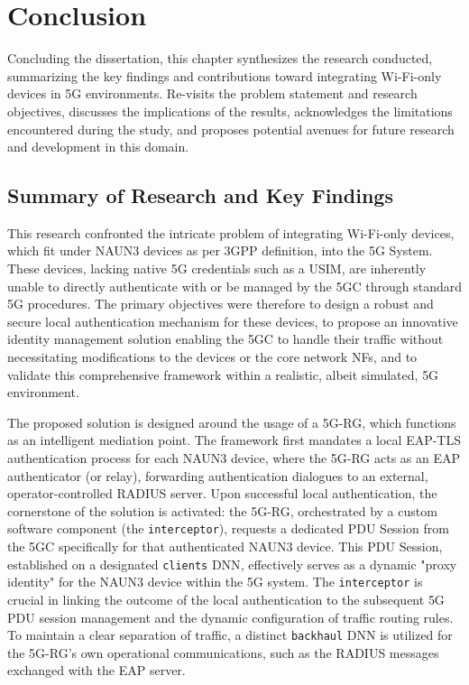 \chapter{Conclusion}%
\label{chapter:conclusion}

\begin{introduction}
Concluding the dissertation, this chapter synthesizes the research conducted, summarizing the key findings and contributions toward integrating Wi-Fi-only devices in \ac{5G} environments. Re-visits the problem statement and research objectives, discusses the implications of the results, acknowledges the limitations encountered during the study, and proposes potential avenues for future research and development in this domain.
\end{introduction}

\section{Summary of Research and Key Findings}

This research confronted the intricate problem of integrating Wi-Fi-only devices, which fit under \ac{NAUN3} devices as per \ac{3GPP} definition, into the \ac{5G} System. These devices, lacking native \ac{5G} credentials such as a \ac{USIM}, are inherently unable to directly authenticate with or be managed by the \ac{5GC} through standard \ac{5G} procedures. The primary objectives were therefore to design a robust and secure local authentication mechanism for these devices, to propose an innovative identity management solution enabling the \ac{5GC} to handle their traffic without necessitating modifications to the devices or the core network \acp{NF}, and to validate this comprehensive framework within a realistic, albeit simulated, \ac{5G} environment.

The proposed solution is designed around the usage of a \ac{5G-RG}, which functions as an intelligent mediation point. The framework first mandates a local \ac{EAP-TLS} authentication process for each \ac{NAUN3} device, where the \ac{5G-RG} acts as an \ac{EAP} authenticator (or relay), forwarding authentication dialogues to an external, operator-controlled \ac{RADIUS} server. Upon successful local authentication, the cornerstone of the solution is activated: the \ac{5G-RG}, orchestrated by a custom software component (the \texttt{interceptor}), requests a dedicated \ac{PDU} Session from the \ac{5GC} specifically for that authenticated \ac{NAUN3} device. This \ac{PDU} Session, established on a designated \texttt{clients} \ac{DNN}, effectively serves as a dynamic "proxy identity" for the \ac{NAUN3} device within the \ac{5G} system. The \texttt{interceptor} is crucial in linking the outcome of the local authentication to the subsequent \ac{5G} \ac{PDU} session management and the dynamic configuration of traffic routing rules. To maintain a clear separation of traffic, a distinct \texttt{backhaul} \ac{DNN} is utilized for the \ac{5G-RG}'s own operational communications, such as the \ac{RADIUS} messages exchanged with the \ac{EAP} server.

